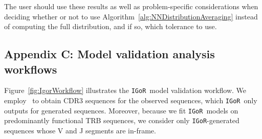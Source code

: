 \documentclass{article}
\newcommand{\igor}{\texttt{IGoR}}
\newcommand{\igblast}{\text{IgBlast}}
\begin{document}
The user should use these results as well as problem-specific considerations when deciding whether or not to use Algorithm~\ref{alg:NNDistributionAveraging} instead of computing the full distribution, and if so, which tolerance to use.

\subsection*{Appendix C: Model validation analysis workflows}
Figure~\ref{fig:IgorWorkflow} illustrates the \igor\ model validation workflow.
We employ \igblast\ to obtain CDR3 sequences for the observed sequences, which \igor\ only outputs for generated sequences.
Moreover, because we fit \igor\ models on predominantly functional TRB sequences, we consider only \igor-generated sequences whose V and J segments are in-frame.  
\end{document}
